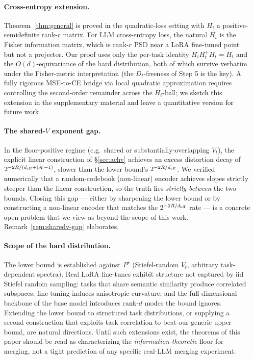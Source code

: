 
\paragraph{Cross-entropy extension.} Theorem~\ref{thm:general}
is proved in the quadratic-loss setting with $H_t$ a
positive-semidefinite rank-$r$ matrix. For LLM cross-entropy
loss, the natural $H_t$ is the Fisher information matrix, which
is rank-$r$ PSD near a LoRA fine-tuned point but not a projector.
Our proof uses only the per-task identity $H_tH_t^+H_t = H_t$
and the $O(d)$-equivariance of the hard distribution, both of
which survive verbatim under the Fisher-metric interpretation
(the $D_t$-freeness of Step 5 is the key). A fully rigorous
MSE-to-CE bridge via local quadratic approximation requires
controlling the second-order remainder across the $H_t$-ball;
we sketch this extension in the supplementary material and
leave a quantitative version for future work.

\paragraph{The shared-$V$ exponent gap.} In the floor-positive
regime (e.g.\ shared or substantially-overlapping $V_t$), the
explicit linear construction of \S\ref{sec:achv} achieves an
excess distortion decay of $2^{-2R/(d_{\mathrm{eff}}+|A|-1)}$, slower than
the lower bound's $2^{-2R/d_{\mathrm{eff}}}$. We verified numerically that
a random-codebook (non-linear) encoder achieves slopes strictly
steeper than the linear construction, so the truth lies
\emph{strictly between} the two bounds. Closing this gap — either
by sharpening the lower bound or by constructing a non-linear
encoder that matches the $2^{-2R/d_{\mathrm{eff}}}$ rate — is a concrete
open problem that we view as beyond the scope of this work.
Remark~\ref{rem:sharedv-gap} elaborates.

\paragraph{Scope of the hard distribution.} The lower bound is
established against $P^\star$ (Stiefel-random $V_t$, arbitrary
task-dependent spectra). Real LoRA fine-tunes exhibit structure
not captured by iid Stiefel random sampling: tasks that share
semantic similarity produce correlated subspaces; fine-tuning
induces anisotropic curvature; and the full-dimensional backbone
of the base model introduces rank-$d$ modes the bound ignores.
Extending the lower bound to structured task distributions, or
supplying a second construction that exploits task correlation
to beat our generic upper bound, are natural directions. Until
such extensions exist, the theorems of this paper should be read
as characterizing the \emph{information-theoretic} floor for
merging, not a tight prediction of any specific real-LLM merging
experiment.

